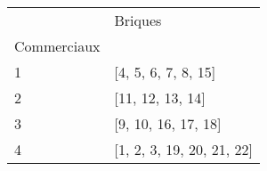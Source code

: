 \documentclass[preview]{standalone}
\begin{document}
    \begin{tabular}{ll}
\toprule
 & Briques \\
Commerciaux &  \\
\midrule
1 & [4, 5, 6, 7, 8, 15] \\
2 & [11, 12, 13, 14] \\
3 & [9, 10, 16, 17, 18] \\
4 & [1, 2, 3, 19, 20, 21, 22] \\
\bottomrule
\end{tabular}

    
\end{document}
